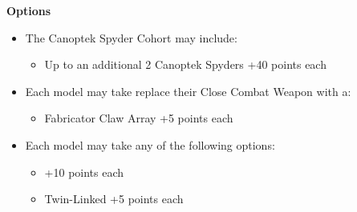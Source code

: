 \begin{minipage}[t]{0.72\textwidth}
	
	\vspace*{2em}
	\textbf{Options}
	\begin{itemize}
		\item The Canoptek Spyder Cohort may include:
		\begin{itemize}
			\item Up to an additional 2 Canoptek Spyders \dotfill +40 points each
		\end{itemize}
		\item Each model may take replace their Close Combat Weapon with a:
		\begin{itemize}
			\item Fabricator Claw Array \dotfill +5 points each
		\end{itemize}
		\item Each model may take any of the following options:
		\begin{itemize}
		\item {} \dotfill +10 points each
		\item Twin-Linked  \dotfill +5 points each
		\end{itemize}
	\end{itemize}
\end{minipage}


\newpage
